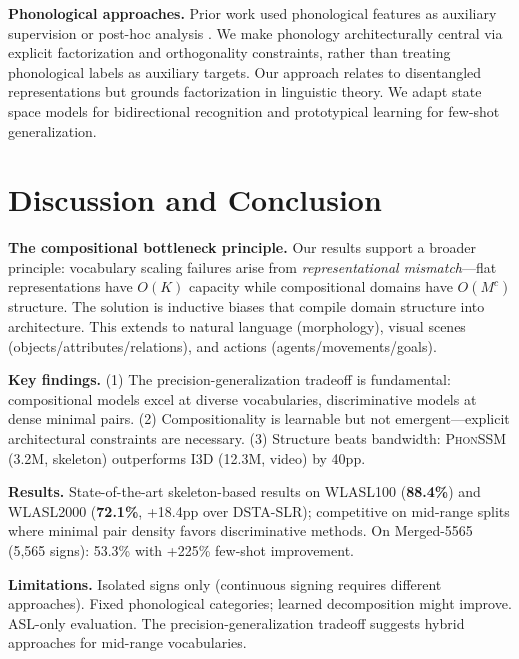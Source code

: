 \documentclass[sigconf,nonacm,anonymous]{acmart}
\theoremstyle{definition}
\theoremstyle{remark}
\newcommand{\phonssm}{\textsc{PhonSSM}}
\begin{document}
\textbf{Phonological approaches.} Prior work used phonological features as auxiliary supervision \cite{koller2015continuous} or post-hoc analysis \cite{bragg2019sign}. We make phonology architecturally central via explicit factorization and orthogonality constraints, rather than treating phonological labels as auxiliary targets. Our approach relates to disentangled representations \cite{higgins2017beta} but grounds factorization in linguistic theory. We adapt state space models \cite{gu2022efficiently, gu2023mamba} for bidirectional recognition and prototypical learning \cite{snell2017prototypical} for few-shot generalization.

\FloatBarrier
\section{Discussion and Conclusion}

\textbf{The compositional bottleneck principle.} Our results support a broader principle: vocabulary scaling failures arise from \textit{representational mismatch}---flat representations have $O(K)$ capacity while compositional domains have $O(M^c)$ structure. The solution is inductive biases that compile domain structure into architecture. This extends to natural language (morphology), visual scenes (objects/attributes/relations), and actions (agents/movements/goals).

\textbf{Key findings.} (1) The precision-generalization tradeoff is fundamental: compositional models excel at diverse vocabularies, discriminative models at dense minimal pairs. (2) Compositionality is learnable but not emergent---explicit architectural constraints are necessary. (3) Structure beats bandwidth: \phonssm{} (3.2M, skeleton) outperforms I3D (12.3M, video) by 40pp.

\textbf{Results.} State-of-the-art skeleton-based results on WLASL100 (\textbf{88.4\%}) and WLASL2000 (\textbf{72.1\%}, +18.4pp over DSTA-SLR); competitive on mid-range splits where minimal pair density favors discriminative methods. On Merged-5565 (5,565 signs): 53.3\% with +225\% few-shot improvement.

\textbf{Limitations.} Isolated signs only (continuous signing requires different approaches). Fixed phonological categories; learned decomposition might improve. ASL-only evaluation. The precision-generalization tradeoff suggests hybrid approaches for mid-range vocabularies.
\end{document}

